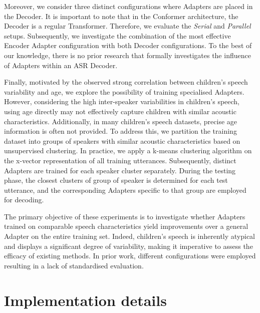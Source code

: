 Moreover, we consider three distinct configurations where Adapters are placed in the Decoder. It is important to note that in the Conformer architecture, the Decoder is a regular Transformer. Therefore, we evaluate the \textit{Serial} and \textit{Parallel} setups. Subsequently, we investigate the combination of the most effective Encoder Adapter configuration with both Decoder configurations. To the best of our knowledge, there is no prior research that formally investigates the influence of Adapters within an \ac{ASR} Decoder. 

Finally, motivated by the observed strong correlation between children's speech variability and age, we explore the possibility of training specialised Adapters. However, considering the high inter-speaker variabilities in children's speech, using age directly may not effectively capture children with similar acoustic characteristics. Additionally, in many children's speech datasets, precise age information is often not provided. To address this, we partition the training dataset into groups of speakers with similar acoustic characteristics based on unsupervised clustering.
In practice, we apply a k-means clustering algorithm on the x-vector representation \cite{snyder2018x} of all training utterances. Subsequently, distinct Adapters are trained for each speaker cluster separately. During the testing phase, the closest clusters of group of speaker is determined for each test utterance, and the corresponding Adapters specific to that group are employed for decoding.

The primary objective of these experiments is to investigate whether Adapters trained on comparable speech characteristics yield improvements over a general Adapter on the entire training set. Indeed,
children's speech is inherently atypical and displays a significant degree of variability, making it imperative to assess the efficacy of existing methods. In prior work, different configurations were employed resulting in a lack of standardised evaluation.

\section{Implementation details}

